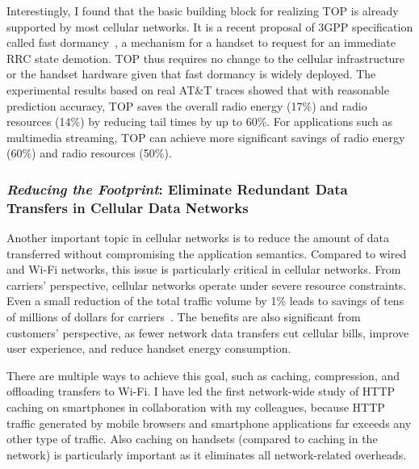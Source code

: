 \documentclass[10pt]{article}
\begin{document}
\begin{small}
Interestingly, I found that the basic building block for realizing TOP is already supported by most cellular networks. It is a recent proposal of 3GPP specification called fast dormancy~\cite{3gpp:085134}, a mechanism for a handset to request for an immediate RRC state demotion. TOP thus requires no change to the cellular infrastructure or the handset hardware given that fast dormancy is widely deployed. The experimental results based on real AT\&T traces showed that with reasonable prediction accuracy, TOP saves the overall radio energy (17\%) and radio resources (14\%) by reducing tail times by up to 60\%. For applications such as multimedia streaming, TOP can achieve more significant savings of radio energy (60\%) and radio resources (50\%).

\subsubsection*{\emph{Reducing the Footprint}: Eliminate Redundant Data Transfers in Cellular Data Networks}

Another important topic in cellular networks is to reduce the amount of data transferred without compromising the application semantics. Compared to wired and Wi-Fi networks, this issue is particularly critical in cellular networks. From carriers' perspective, cellular networks operate under severe resource constraints. Even a small reduction of the total traffic volume by 1\% leads to savings of tens of millions of dollars for carriers~\cite{cellular_cost}. The benefits are also significant from customers' perspective, as fewer network data transfers cut cellular bills, improve user experience, and reduce handset energy consumption.

There are multiple ways to achieve this goal, such as caching, compression, and offloading transfers to Wi-Fi. I have led the first network-wide study of HTTP caching on smartphones in collaboration with my colleagues, because HTTP traffic generated by mobile browsers and smartphone applications far exceeds any other type of traffic. Also caching on handsets (compared to caching in the network) is particularly important as it eliminates all network-related overheads.



\end{small}
\end{document}
